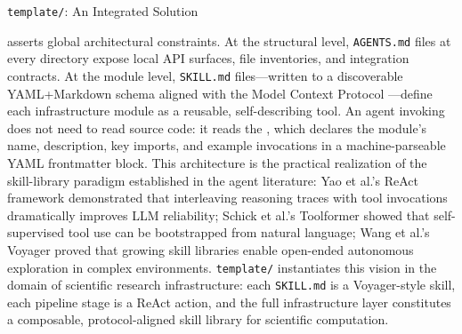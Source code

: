 \documentclass[
  ignorenonframetext,
]{beamer}
\begin{document}
\begin{frame}{\texttt{template/}: An
Integrated Solution}
\begin{enumerate}
  asserts global architectural constraints. At the structural level,
  \texttt{AGENTS.md} files at every directory expose local API surfaces,
  file inventories, and integration contracts. At the module level,
  \texttt{SKILL.md} files---written to a discoverable YAML+Markdown
  schema aligned with the Model Context Protocol
  ---define each infrastructure module as a
  reusable, self-describing tool. An agent invoking
   does not need to read source code:
  it reads the , which declares the module's
  name, description, key imports, and example invocations in a
  machine-parseable YAML frontmatter block. This architecture is the
  practical realization of the skill-library paradigm established in the
  agent literature: Yao et al.'s ReAct framework 
  demonstrated that interleaving reasoning traces with tool invocations
  dramatically improves LLM reliability; Schick et al.'s Toolformer
   showed that self-supervised tool use can
  be bootstrapped from natural language; Wang et al.'s Voyager
   proved that growing skill libraries enable
  open-ended autonomous exploration in complex environments.
  \texttt{template/} instantiates this vision in the domain of
  scientific research infrastructure: each \texttt{SKILL.md} is a
  Voyager-style skill, each pipeline stage is a ReAct action, and the
  full infrastructure layer constitutes a composable, protocol-aligned
  skill library for scientific computation.
\end{enumerate}
\end{frame}
\end{document}
